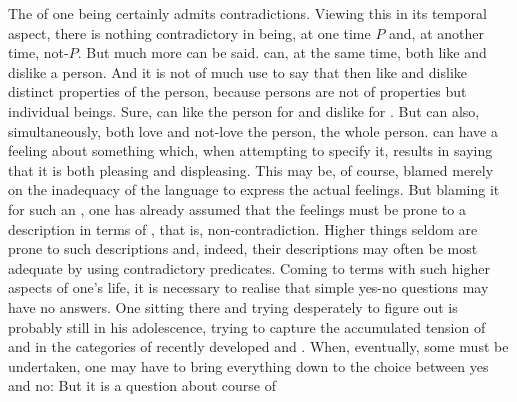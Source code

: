 The  of one being certainly admits
contradictions.  Viewing this  in its
temporal aspect, there is nothing contradictory in being, at one time
$P$ and, at another time, not-$P$.  But much more can be said.   can, at
the same time, both like and dislike a person.  And it is not of much use to say
that then  like and dislike distinct properties of the person, because
persons are not  of properties but individual beings.  Sure,
 can like the person for  and dislike for .  But
 can also, simultaneously, both love and not-love the person, the whole
person.    can have a  feeling about something
which, when attempting to specify it, results in saying that it is both pleasing
and displeasing. This may be, of course, blamed merely on the inadequacy of the
language to express the actual feelings. But blaming it for such an
, one has already assumed that the feelings must be prone to a
 description in terms of , that is, non-contradiction.
Higher things seldom are prone to such descriptions and, indeed, their
descriptions may often be most adequate by using contradictory predicates.
Coming to terms with such higher aspects of one's life, it is necessary to
realise that simple yes-no questions may have no answers.  One sitting there and
trying desperately to figure out 
is probably still in his adolescence, trying to capture the accumulated tension
of  and  in the categories of recently developed
 and .
%
%
When, eventually, some  must be undertaken, one may have to bring
everything down to the  choice between yes and no:  But it is a question about  course of
